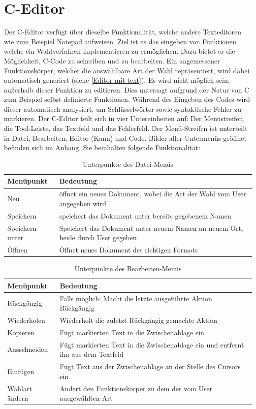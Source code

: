 \documentclass[a4paper]{scrreprt}
\begin{document}
\section{C-Editor}
Der C-Editor verfügt über dieselbe Funktionalität, welche andere Texteditoren wie zum Beispiel Notepad aufweisen. Ziel ist es das eingeben von Funktionen welche ein Wahlverfahren implementieren zu ermöglichen. Dazu bietet er die Möglichkeit, C-Code zu schreiben und zu bearbeiten. Ein angemessener Funktionskörper, welcher die auswählbare Art der Wahl repräsentiert, wird dabei automatisch generiert (siehe \ref{Editor-mit-text}). Es wird nicht möglich sein, außerhalb dieser Funktion zu editieren. Dies untersagt aufgrund der Natur von C zum Beispiel selbst definierte Funktionen. Während des Eingeben des Codes wird dieser automatisch analysiert, um Schlüsselwörter sowie syntaktische Fehler zu markieren. 
Der C-Editor teilt sich in vier Untereinheiten auf: Der Menüstreifen, die Tool-Leiste, das Textfeld und das Fehlerfeld. Der Menü-Streifen ist unterteilt in Datei, Bearbeiten, Editor (Kann) und Code. Bilder aller Untermenüs geöffnet befinden sich im Anhang. Sie beinhalten folgende Funktionalität:

\begin{table}[H]
\begin{tabular}{|p{3cm}|p{12cm}|}
Menüpunkt & Bedeutung \\
\hline
Neu & öffnet ein neues Dokument, wobei die Art der Wahl vom User angegeben wird \\
Speichern & speichert das Dokument unter bereits gegebenem Namen \\
Speichern unter & Speichert das Dokument unter neuem Namen an neuem Ort, beide durch User gegeben \\
Öffnen & Öffnet neues Dokument des richtigen Formats
\end{tabular}
\label{Datei-Menüpunkte}
\caption{Unterpunkte des Datei-Menüs}
\end{table}

\begin{table}[H]
\begin{tabular}{|p{3cm}|p{12cm}|}
Menüpunkt & Bedeutung \\
\hline
Rückgängig & Falls möglich: Macht die letzte ausgeführte Aktion Rückgängig \\
Wiederholen & Wiederholt die zuletzt Rückgängig gemachte Aktion \\
Kopieren & Fügt markierten Text in die Zwischenablage ein \\
Ausschneiden & Fügt markierten Text in die Zwischenablage ein und entfernt ihn aus dem Textfeld \\
Einfügen & Fügt Text aus der Zwischenablage an der Stelle des Cursors ein \\
Wahlart ändern & Ändert den Funktionskörper zu dem der vom User ausgewählten Art
\end{tabular}
\label{Bearbeiten-Menüpunkte}
\caption{Unterpunkte des Bearbeiten-Menüs}
\end{table}
\end{document}
